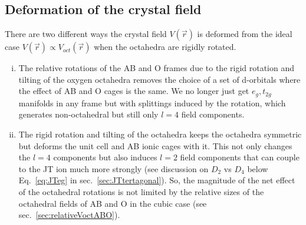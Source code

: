 \documentclass[a4paper,prb,twocolumn]{revtex4-1}  %
\newcommand{\com}[1]{}
\begin{document}
\com{
\begin{align}
\vec a_1 & =  \cos\beta ( 1,1,0 ) ,\\
\vec a_2 & =  \cos\alpha  \cos\beta(-1,1,0 ),\\
\vec a_3 & =  \cos\alpha ( 0,0,2 ).
\end{align}
}





\subsection{Deformation of the crystal field}
\label{sec:deformCF}


\com{Before we present calculations and results, let's briefly
summarise the contribution of the AB cages towards the crystal field Hamiltonian
....}
 
There are two different ways the crystal field $V(\vec r)$
 is deformed from the ideal case $V(\vec r) \propto V_{oct}(\vec r)$
 when the octahedra are rigidly rotated. 
\begin{enumerate}[(i)]
\item
The relative rotations of the AB and O frames due to
the rigid rotation and tilting of the oxygen octahedra removes the
choice of a set of d-orbitals where the effect of 
AB and O cages is the same. 
We no longer just get $e_g, t_{2g}$ manifolds in any frame but with splittings induced by the rotation,
which generates non-octahedral but still only $l=4$ field components. 
\item
The rigid rotation and tilting of the octahedra keeps the octahedra symmetric but deforms the unit cell and AB ionic cages with it.
This not only changes the $l=4$ components but also induces 
$l=2$ field components
that can couple to the JT ion much more strongly (see discussion on $D_2$ vs $D_4$ below Eq.~\ref{eq:JTeg} in sec.~\ref{sec:JTtertagonal}).
So, the magnitude of the net effect of the octahedral rotations is not limited by the relative sizes of the octahedral fields of AB and O in the cubic case (see sec.~\ref{sec:relativeVoctABO}).
\end{enumerate}
\end{document}
